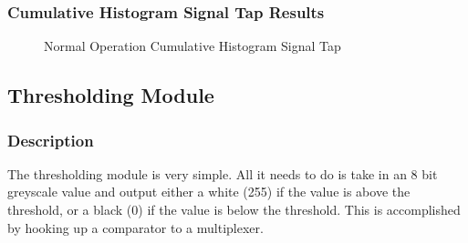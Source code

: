 \documentclass[12pt]{article}
\begin{document}
  \subsubsection{Cumulative Histogram Signal Tap Results}
  \begin{figure}[H]
    \caption{Normal Operation Cumulative Histogram Signal Tap}
    \label{fig:cumulative_histogram_signal_tap_normal_operation}
  \end{figure}

  \subsection{Thresholding Module}
  \subsubsection{Description}
  The thresholding module is very simple. All it needs to do is take in an 8 bit greyscale value and output either a white (255) if the value is above the threshold, or a black (0) if the value is below the threshold. This is accomplished by hooking up a comparator to a multiplexer.
  
\end{document}
